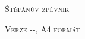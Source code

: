 ﻿
\vspace*{\fill}
\begin{center}
\begin{Huge}
\textsc{Štěpánův zpěvník}
\end{Huge}
\textsc{\linebreak\linebreak Verze {\the\year}-{\formatTwoDigits{\the\month}}-{\formatTwoDigits{\the\day}}, A4 formát}
\end{center}
\vspace*{\fill}

\pagebreak